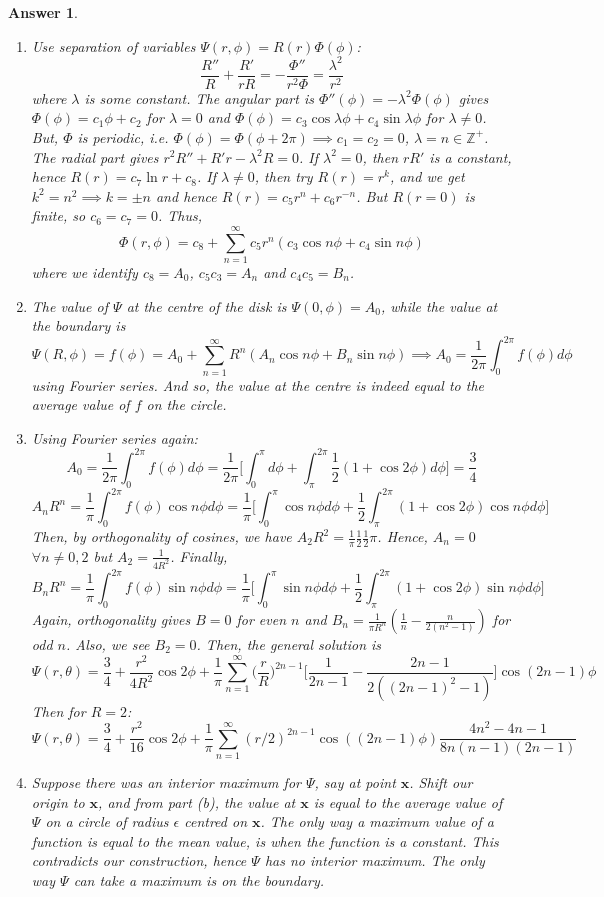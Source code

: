 \documentclass[a4paper]{article}
\newtheorem{ans}{Answer}[section]
\theoremstyle{new}
\begin{document}
\begin{ans}\leavevmode
\begin{enumerate}[label=(\alph*)]
\item Use separation of variables $\Psi(r,\phi)=R(r)\Phi(\phi)$:
$$\frac{R''}{R}+\frac{R'}{rR}=-\frac{\Phi''}{r^2\Phi}=\frac{\lambda^2}{r^2}$$
where $\lambda$ is some constant. The angular part is $\Phi''(\phi)=-\lambda^2\Phi(\phi)$ gives $\Phi(\phi)=c_1\phi+c_2$ for $\lambda=0$ and $\Phi(\phi)=c_3\cos\lambda\phi+c_4\sin\lambda\phi$ for $\lambda\neq 0$. But, $\Phi$ is periodic, i.e. $\Phi(\phi)=\Phi(\phi+2\pi)\implies c_1=c_2=0$, $\lambda=n\in\mathbb{Z}^+$.\\[5pt]
The radial part gives $r^2R''+R'r-\lambda^2R=0$. If $\lambda^2=0$, then $rR'$ is a constant, hence $R(r)=c_7\ln r+c_8$. If $\lambda\neq 0$, then try $R(r)=r^k$, and we get $k^2=n^2\implies k=\pm n$ and hence $R(r)=c_5r^n+c_6r^{-n}$. But $R(r=0)$ is finite, so $c_6=c_7=0$. Thus,
$$\Phi(r,\phi)=c_8+\sum_{n=1}^\infty c_5r^n(c_3\cos n\phi+c_4\sin n\phi)$$
where we identify $c_8=A_0$, $c_5c_3=A_n$ and $c_4c_5=B_n$.
\item The value of $\Psi$ at the centre of the disk is $\Psi(0,\phi)=A_0$, while the value at the boundary is 
$$\Psi(R,\phi)=f(\phi)=A_0+\sum_{n=1}^\infty R^n(A_n\cos n\phi+B_n\sin n\phi)\implies A_0=\frac{1}{2\pi}\int_0^{2\pi} f(\phi)d\phi$$
using Fourier series. And so, the value at the centre is indeed equal to the average value of $f$ on the circle.
\item Using Fourier series again:
$$A_0=\frac{1}{2\pi}\int_0^{2\pi} f(\phi)d\phi=\frac{1}{2\pi}\bigg[\int_0^\pi d\phi+\int_\pi^{2\pi}\frac{1}{2}(1+\cos 2\phi)d\phi\bigg]=\frac{3}{4}$$
$$A_nR^n=\frac{1}{\pi}\int_0^{2\pi}f(\phi)\cos n\phi d\phi=\frac{1}{\pi}\bigg[\int_0^\pi \cos n\phi d\phi+\frac{1}{2}\int_\pi^{2\pi}(1+\cos 2\phi)\cos n\phi d\phi\bigg]$$
Then, by orthogonality of cosines, we have $A_2R^2=\frac{1}{\pi}\frac{1}{2}\frac{1}{2}\pi$. Hence, $A_n=0$ $\forall n\neq 0,2$ but $A_2=\frac{1}{4R^2}$. Finally,
$$B_nR^n=\frac{1}{\pi}\int_0^{2\pi}f(\phi)\sin n\phi d\phi=\frac{1}{\pi}\bigg[\int_0^\pi \sin n\phi d\phi+\frac{1}{2}\int_\pi^{2\pi}(1+\cos 2\phi)\sin n\phi d\phi\bigg]$$
Again, orthogonality gives $B=0$ for even $n$ and $B_n=\frac{1}{\pi R^n}(\frac{1}{n}-\frac{n}{2(n^2-1)})$ for odd $n$. Also, we see $B_2=0$. Then, the general solution is 
$$\Psi(r,\theta)=\frac{3}{4}+\frac{r^2}{4R^2}\cos 2\phi+\frac{1}{\pi}\sum_{n=1}^\infty\bigg(\frac{r}{R}\bigg)^{2n-1}\bigg[\frac{1}{2n-1}-\frac{2n-1}{2((2n-1)^2-1)}\bigg]\cos(2n-1)\phi$$
Then for $R=2$:
$$\Psi(r,\theta)=\frac{3}{4}+\frac{r^2}{16}\cos 2\phi+\frac{1}{\pi}\sum_{n=1}^\infty(r/2)^{2n-1}\cos((2n-1)\phi)\frac{4n^2-4n-1}{8n(n-1)(2n-1)}$$
\item Suppose there was an interior maximum for $\Psi$, say at point $\mathbf{x}$. Shift our origin to $\mathbf{x}$, and from part (b), the value at $\mathbf{x}$ is equal to the average value of $\Psi$ on a circle of radius $\epsilon$ centred on $\mathbf{x}$. The only way a maximum value of a function is equal to the mean value, is when the function is a constant. This contradicts our construction, hence $\Psi$ has no interior maximum. The only way $\Psi$ can take a maximum is on the boundary.
\end{enumerate}
\end{ans}
\end{document}
